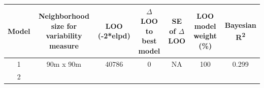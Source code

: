 \documentclass[twoside,12pt,final]{ucthesis-CA2012}
\begin{document}
\begin{ucmainmatter}
\begin{longtable}[]{@{}ccccccc@{}}
\midrule
\endfirsthead
\toprule
\begin{minipage}[b]{0.06\columnwidth}\centering\strut
Model\strut
\end{minipage} & \begin{minipage}[b]{0.17\columnwidth}\centering\strut
Neighborhood size for variability measure\strut
\end{minipage} & \begin{minipage}[b]{0.09\columnwidth}\centering\strut
LOO (-2*elpd)\strut
\end{minipage} & \begin{minipage}[b]{0.11\columnwidth}\centering\strut
\(\Delta\) LOO to best model\strut
\end{minipage} & \begin{minipage}[b]{0.11\columnwidth}\centering\strut
SE of \(\Delta\) LOO\strut
\end{minipage} & \begin{minipage}[b]{0.16\columnwidth}\centering\strut
LOO model weight (\%)\strut
\end{minipage} & \begin{minipage}[b]{0.11\columnwidth}\centering\strut
Bayesian R\textsuperscript{2}\strut
\end{minipage}\tabularnewline
\midrule
\endhead
\begin{minipage}[t]{0.06\columnwidth}\centering\strut
1\strut
\end{minipage} & \begin{minipage}[t]{0.17\columnwidth}\centering\strut
90m x 90m\strut
\end{minipage} & \begin{minipage}[t]{0.09\columnwidth}\centering\strut
40786\strut
\end{minipage} & \begin{minipage}[t]{0.11\columnwidth}\centering\strut
0\strut
\end{minipage} & \begin{minipage}[t]{0.11\columnwidth}\centering\strut
NA\strut
\end{minipage} & \begin{minipage}[t]{0.16\columnwidth}\centering\strut
100\strut
\end{minipage} & \begin{minipage}[t]{0.11\columnwidth}\centering\strut
0.299\strut
\end{minipage}\tabularnewline
\begin{minipage}[t]{0.06\columnwidth}\centering\strut
2\strut
\end{minipage} & \begin{minipage}[t]{0.17\columnwidth}\centering\strut

\end{minipage}
\end{longtable}
\end{ucmainmatter}
\end{document}

